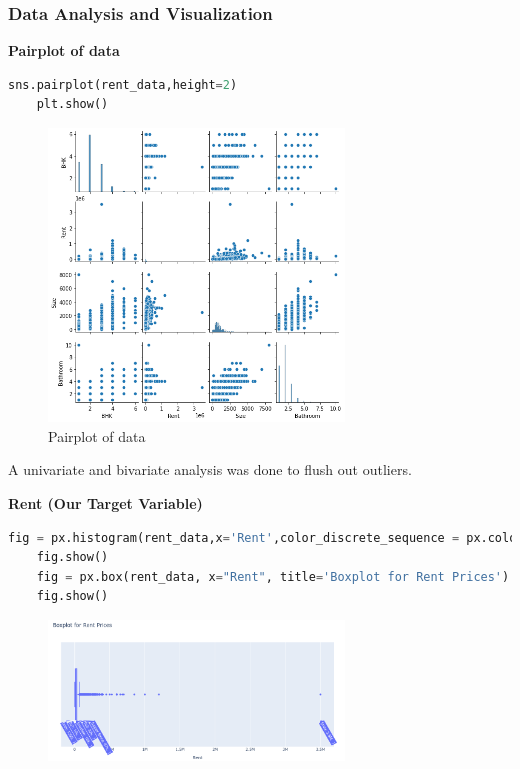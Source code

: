 \bigskip
\subsubsection{Data Analysis and Visualization}
\textbf{Pairplot of data}\par\bigskip\noindent

\begin{lstlisting}[language=python]
    sns.pairplot(rent_data,height=2)
    plt.show()
\end{lstlisting}

\clearpage

\begin{figure}[h]
    \centering
    \includegraphics[width=0.7\textwidth]{Images/pairplot.png}
    \caption{Pairplot of data}
\end{figure}

A univariate and bivariate analysis was done to flush out outliers.~\cite{house-rent-prediction-model}\par\medskip

\noindent
\textbf{Rent (Our Target Variable)}
\begin{lstlisting}[language=python]
    fig = px.histogram(rent_data,x='Rent',color_discrete_sequence = px.colors.qualitative.Set3, title="Rent Prices Distribution Histogram")
    fig.show()
    fig = px.box(rent_data, x="Rent", title='Boxplot for Rent Prices')
    fig.show()
\end{lstlisting}

\clearpage
\begin{figure}[h]
    \centering
    \includegraphics[width=0.7\textwidth]{Images/boxplotrent.png}
\end{figure}

